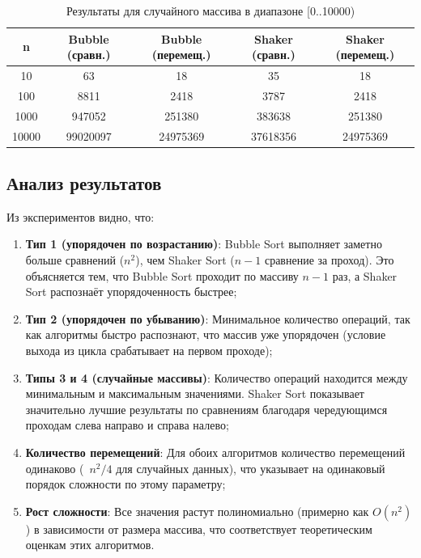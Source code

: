 \documentclass[a4paper,12pt,titlepage]{article}
\begin{document}
\begin{table}[h]
\centering
\begin{tabular}{|c|c|c|c|c|}
    \hline
    \textbf{n} & \textbf{Bubble (сравн.)} & \textbf{Bubble (перемещ.)} & \textbf{Shaker (сравн.)} & \textbf{Shaker (перемещ.)} \\
    \hline
    10 & 63 & 18 & 35 & 18 \\
    100 & 8811 & 2418 & 3787 & 2418 \\
    1000 & 947052 & 251380 & 383638 & 251380 \\
    10000 & 99020097 & 24975369 & 37618356 & 24975369 \\
    \hline
\end{tabular}
\caption{Результаты для случайного массива в диапазоне [0..10000)}
\end{table}

\subsection{Анализ результатов}

Из экспериментов видно, что:

\begin{enumerate}
    \item \textbf{Тип 1 (упорядочен по возрастанию)}: Bubble Sort выполняет заметно больше сравнений ($n^2$), чем Shaker Sort ($n-1$ сравнение за проход). Это объясняется тем, что Bubble Sort проходит по массиву $n-1$ раз, а Shaker Sort распознаёт упорядоченность быстрее;
    
    \item \textbf{Тип 2 (упорядочен по убыванию)}: Минимальное количество операций, так как алгоритмы быстро распознают, что массив уже упорядочен (условие выхода из цикла срабатывает на первом проходе);
    
    \item \textbf{Типы 3 и 4 (случайные массивы)}: Количество операций находится между минимальным и максимальным значениями. Shaker Sort показывает значительно лучшие результаты по сравнениям благодаря чередующимся проходам слева направо и справа налево;
    
    \item \textbf{Количество перемещений}: Для обоих алгоритмов количество перемещений одинаково (~$n^2/4$ для случайных данных), что указывает на одинаковый порядок сложности по этому параметру;
    
    \item \textbf{Рост сложности}: Все значения растут полиномиально (примерно как $O(n^2)$) в зависимости от размера массива, что соответствует теоретическим оценкам этих алгоритмов.
\end{enumerate}
\end{document}
